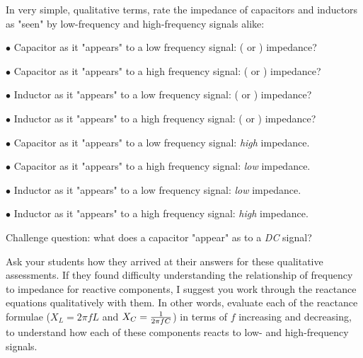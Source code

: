 

In very simple, qualitative terms, rate the impedance of capacitors and inductors as "seen" by low-frequency and high-frequency signals alike:

\medskip
\item{$\bullet$} Capacitor as it "appears" to a low frequency signal: ( or ) impedance?
\item{$\bullet$} Capacitor as it "appears" to a high frequency signal: ( or ) impedance?
\vskip 10pt
\item{$\bullet$} Inductor as it "appears" to a low frequency signal: ( or ) impedance?
\item{$\bullet$} Inductor as it "appears" to a high frequency signal: ( or ) impedance?
\medskip







\medskip
\item{$\bullet$} Capacitor as it "appears" to a low frequency signal: {\it high} impedance.
\item{$\bullet$} Capacitor as it "appears" to a high frequency signal: {\it low} impedance.
\vskip 10pt
\item{$\bullet$} Inductor as it "appears" to a low frequency signal: {\it low} impedance.
\item{$\bullet$} Inductor as it "appears" to a high frequency signal: {\it high} impedance.
\medskip

\vskip 10pt

Challenge question: what does a capacitor "appear" as to a {\it DC} signal?







Ask your students how they arrived at their answers for these qualitative assessments.  If they found difficulty understanding the relationship of frequency to impedance for reactive components, I suggest you work through the reactance equations qualitatively with them.  In other words, evaluate each of the reactance formulae ($X_L = 2 \pi f L$ and $X_C = {1 \over {2 \pi f C}}$) in terms of $f$ increasing and decreasing, to understand how each of these components reacts to low- and high-frequency signals.




